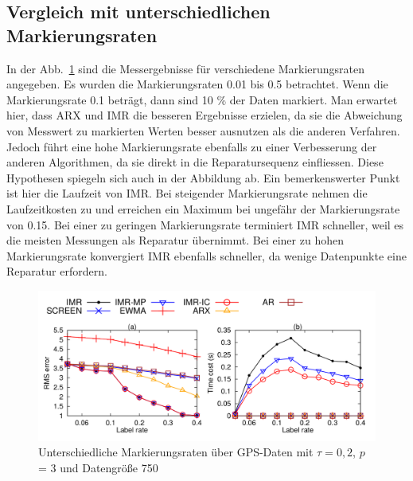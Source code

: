 \subsection{Vergleich mit unterschiedlichen Markierungsraten}

In der Abb.~\ref{varying_labeling_rate} sind die Messergebnisse für
verschiedene Markierungsraten angegeben. Es wurden die Markierungsraten 0.01
bis 0.5 betrachtet. Wenn die Markierungsrate 0.1 beträgt, dann sind 10 \% der
Daten markiert. Man erwartet hier, dass ARX und IMR die besseren Ergebnisse
erzielen, da sie die Abweichung von Messwert zu markierten Werten besser
ausnutzen als die anderen Verfahren. Jedoch führt eine hohe Markierungsrate
ebenfalls zu einer Verbesserung der anderen Algorithmen, da sie direkt in die
Reparatursequenz einfliessen. Diese Hypothesen spiegeln sich auch in der
Abbildung ab. Ein bemerkenswerter Punkt ist hier die Laufzeit von IMR. Bei
steigender Markierungsrate nehmen die Laufzeitkosten zu und erreichen ein
Maximum bei ungefähr der Markierungsrate von 0.15. Bei einer zu geringen
Markierungsrate terminiert IMR schneller, weil es die meisten Messungen als
Reparatur übernimmt. Bei einer zu hohen Markierungsrate konvergiert IMR
ebenfalls schneller, da wenige Datenpunkte eine Reparatur erfordern. 

\begin{figure}[htbp]
    \centering
    \includegraphics[width=\textwidth]{../plots/varying_labeling_rate.png}
    \caption{Unterschiedliche Markierungsraten über GPS-Daten mit $\tau = 0,2$, $p$ = 3 und Datengröße 750}%
   \label{varying_labeling_rate}
\end{figure}
